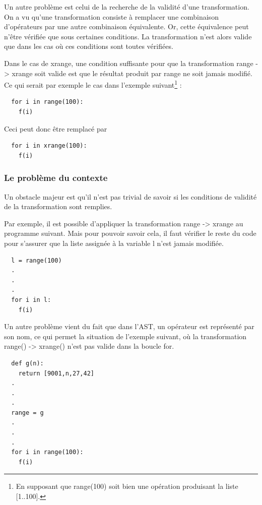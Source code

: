 \documentclass[a4paper]{article}
\begin{document}
Un autre problème est celui de la recherche de la validité d'une transformation. On a vu qu'une transformation consiste à remplacer une combinaison d'opérateurs par une autre combinaison équivalente. Or, cette équivalence peut n'être vérifiée que sous certaines conditions. La transformation n'est alors valide que dans les cas où ces conditions sont toutes vérifiées.

Dans le cas de xrange, une condition suffisante pour que la transformation range -> xrange soit valide est que le résultat produit par range ne soit jamais modifié. Ce qui serait par exemple le cas dans l'exemple suivant\footnote{En supposant que range(100) soit bien une opération produisant la liste [1..100].} :

\begin{verbatim}
  for i in range(100):
    f(i)
\end{verbatim}

Ceci peut donc être remplacé par

\begin{verbatim}
  for i in xrange(100):
    f(i)
\end{verbatim}

\subsubsection{Le problème du contexte}

Un obstacle majeur est qu'il n'est pas trivial de savoir si les conditions de validité de la transformation sont remplies.

Par exemple, il est possible d'appliquer la transformation range -> xrange au programme suivant. Mais pour pouvoir savoir cela, il faut vérifier le reste du code pour s'assurer que la liste assignée à la variable l n'est jamais modifiée.

\begin{verbatim}
  l = range(100)
  .
  .
  .
  for i in l:
    f(i)
\end{verbatim}

Un autre problème vient du fait que dans l'AST, un opérateur est représenté par son nom, ce qui permet la situation de l'exemple suivant, où la transformation range() -> xrange() n'est pas valide dans la boucle for.

\begin{verbatim}
  def g(n):
    return [9001,n,27,42]
  .
  .
  .
  range = g
  .
  .
  .
  for i in range(100):
    f(i)
\end{verbatim}
\end{document}
